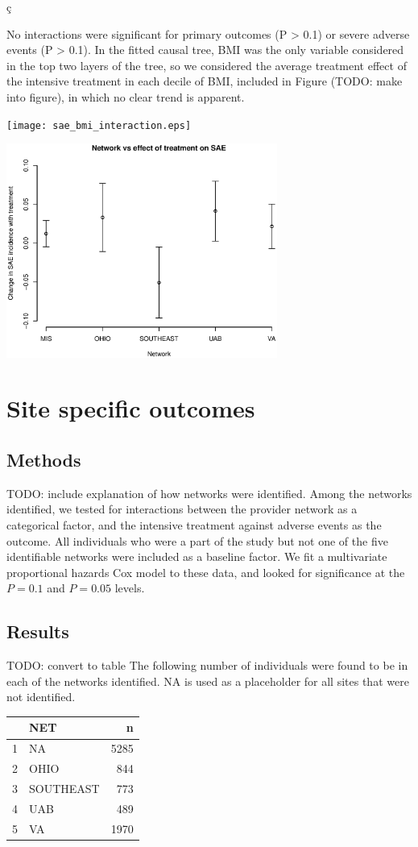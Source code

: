 ç\documentclass[10pt]{article}
\begin{document}
No interactions were significant for primary outcomes (P > 0.1) or severe
adverse events (P > 0.1). In the fitted causal tree, BMI was the only variable
considered in the top two layers of the tree, so we considered the average
treatment effect of the intensive treatment in each decile of BMI, included in
Figure (TODO: make into figure), in which no clear trend is apparent. 

\texttt{[image: sae\_bmi\_interaction.eps]}

\includegraphics[width=3.5in]{sae_network_interaction.eps}

\section{Site specific outcomes}
\subsection{Methods}
TODO: include explanation of how networks were identified.
Among the networks identified, we tested for interactions between the provider
network as a categorical factor, and the intensive treatment against adverse
events as the outcome. All individuals who were a part of the study but not one
of the five identifiable networks were included as a baseline factor. We fit a
multivariate proportional hazards Cox model to these data, and looked for
significance at the $P = 0.1$ and $P=0.05$ levels.

\subsection{Results}
TODO: convert to table
The following number of individuals were found to be in each of the networks
identified. NA is used as a placeholder for all sites that were not identified.

\begin{center}
\begin{tabular}{ |c|l|r| } 
 \hline
 &      \textbf{NET}&   \textbf{n} \\
 \hline
1&       NA&5285 \\
 \hline
2&     OHIO& 844 \\
 \hline
3&SOUTHEAST& 773 \\
 \hline
4      &UAB& 489 \\
 \hline
5      & VA&1970 \\
 \hline
\end{tabular}
\end{center}
\end{document}
